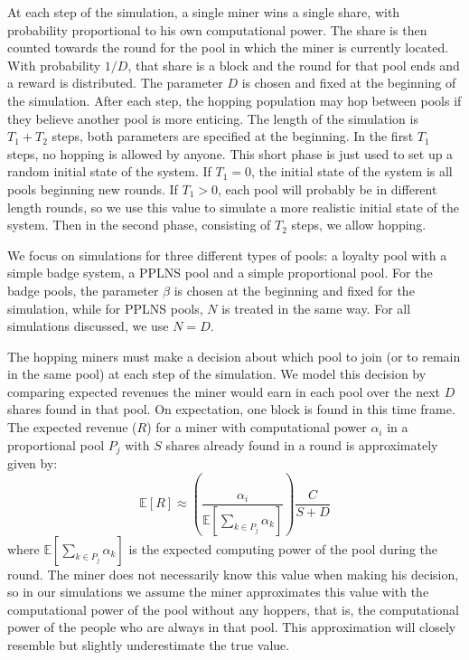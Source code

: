 \documentclass{article}
\theoremstyle{plain}
\theoremstyle{definition}
\begin{document}
At each step of the simulation, a single miner wins a single share, with probability proportional to his own computational power. The share is then counted towards the round for the pool in which the miner is currently located. With probability $1/D$, that share is a block and the round for that pool ends and a reward is distributed. The parameter $D$ is chosen and fixed at the beginning of the simulation. After each step, the hopping population may hop between pools if they believe another pool is more enticing. The length of the simulation is $T_1+T_2$ steps, both parameters are specified at the beginning. In the first $T_1$ steps, no hopping is allowed by anyone. This short phase is just used to set up a random initial state of the system. If $T_1 = 0$, the initial state of the system is all pools beginning new rounds. If $T_1 > 0$, each pool will probably be in different length rounds, so we use this value to simulate a more realistic initial state of the system. Then in the second phase, consisting of $T_2$ steps, we allow hopping.

We focus on simulations for three different types of pools: a loyalty pool with a simple badge system, a PPLNS pool and a simple proportional pool. For the badge pools, the parameter $\beta$ is chosen at the beginning and fixed for the simulation, while for PPLNS pools, $N$ is treated in the same way. For all simulations discussed, we use $N=D$. 

The hopping miners must make a decision about which pool to join (or to remain in the same pool) at each step of the simulation. We model this decision by comparing expected revenues the miner would earn in each pool over the next $D$ shares found in that pool. On expectation, one block is found in this time frame. The expected revenue ($R$) for a miner with computational power $\alpha_i$ in a proportional pool $P_j$ with $S$ shares already found in a round is approximately given by:
\begin{equation*}
\mathbb{E}[R] \approx \left(\frac{\alpha_i}{\mathbb{E}[\sum_{k \in P_j}\alpha_k]} \right) \frac{C}{S+D}
\end{equation*}
where $\mathbb{E}[\sum_{k \in P_j}\alpha_k]$ is the expected computing power of the pool during the round. The miner does not necessarily know this value when making his decision, so in our simulations we assume the miner approximates this value with the computational power of the pool without any hoppers, that is, the computational power of the people who are always in that pool. This approximation will closely resemble but slightly underestimate the true value.
\end{document}
